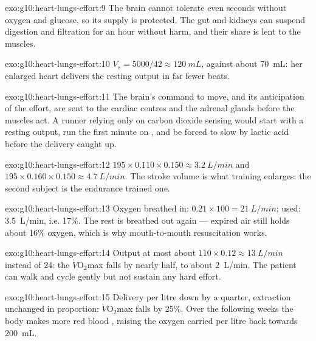 \begin{solution}{exo:g10:heart-lungs-effort:9}
The brain cannot tolerate even seconds without oxygen and glucose, so
its supply is protected. The gut and kidneys can suspend digestion and
filtration for an hour without harm, and their share is lent to the
muscles.
\end{solution}

\begin{solution}{exo:g10:heart-lungs-effort:10}
$V_s = 5000/42 \approx \qty{120}{mL}$, against about \qty{70}{mL}: her
enlarged heart delivers the resting output in far fewer beats.
\end{solution}

\begin{solution}{exo:g10:heart-lungs-effort:11}
The brain's command to move, and its anticipation of the effort, are
sent to the cardiac centres and the adrenal glands before the muscles
act. A runner relying only on carbon dioxide sensing would start with
a resting output, run the first minute on , and be forced
to slow by lactic acid before the delivery caught up.
\end{solution}

\begin{solution}{exo:g10:heart-lungs-effort:12}
$195 \times 0.110 \times 0.150 \approx \qty{3.2}{L/min}$ and
$195 \times 0.160 \times 0.150 \approx \qty{4.7}{L/min}$. The stroke
volume is what training enlarges: the second subject is the endurance
trained one.
\end{solution}

\begin{solution}{exo:g10:heart-lungs-effort:13}
Oxygen breathed in: $0.21 \times 100 = \qty{21}{L/min}$; used:
\qty{3.5}{L/min}, i.e. 17\%. The rest is breathed out again --- expired
air still holds about 16\% oxygen, which is why mouth-to-mouth
resuscitation works.
\end{solution}

\begin{solution}{exo:g10:heart-lungs-effort:14}
Output at most about $110 \times 0.12 \approx \qty{13}{L/min}$ instead
of 24: the $\dot V\!\mathrm{O_2}$max falls by nearly half, to about
\qty{2}{L/min}. The patient can walk and cycle gently but not sustain
any hard effort.
\end{solution}

\begin{solution}{exo:g10:heart-lungs-effort:15}
Delivery per litre down by a quarter, extraction unchanged in
proportion: $\dot V\!\mathrm{O_2}$max falls by 25\%. Over the
following weeks the body makes more red blood , raising the
oxygen carried per litre back towards \qty{200}{mL}.
\end{solution}

